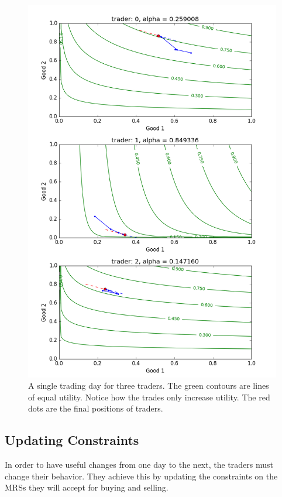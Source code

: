 \documentclass[12pt,a4paper,titlepage]{article}
\begin{document}
\begin{figure}[H]
    \centering
    \includegraphics[width=\textwidth]{allocations_(seed_13).png}
    \caption{
      A single trading day for three traders.
      The green contours are lines of equal utility.
      Notice how the trades only increase utility.
      The red dots are the final positions of traders.
    }
    \label{fig:day}
\end{figure}

\subsection{Updating Constraints}
In order to have useful changes from one day to the next, the traders must change their behavior.
They achieve this by updating the constraints on the MRSs they will accept for buying and selling.
\end{document}
